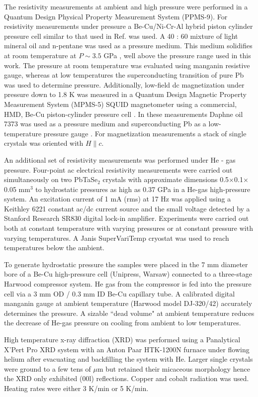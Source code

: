\documentclass[aps,prb,preprint,groupedaddress,showpacs,amsmath,amssymb]{revtex4}
\begin{document}
The resistivity measurements at ambient and high  pressure were performed in a Quantum Design Physical Property Measurement System (PPMS-9). For resistivity measurements under pressure a Be-Cu/Ni-Cr-Al hybrid piston cylinder pressure cell similar to that used in Ref.  was used. A 40 : 60 mixture of light mineral oil and n-pentane was used as a pressure medium. This medium solidifies at room temperature at $P \sim 3.5$ GPa \cite{bud84a,tor15a}, well above the pressure range used in this work. The pressure at room temperature was evaluated using manganin resistive gauge, whereas at low temperatures the superconducting transition of pure Pb \cite{eil81a} was used to determine pressure. Additionally, low-field dc magnetization under pressure down to 1.8 K was measured in a Quantum Design Magnetic Property Measurement System (MPMS-5) SQUID magnetometer using a commercial, HMD, Be-Cu piston-cylinder pressure cell \cite{hmd}. In these measurements Daphne oil 7373 was used as a pressure medium and superconducting Pb as a low-temperature pressure gauge \cite{eil81a}. For magnetization measurements a stack of single crystals was oriented with $H \| c$.

An additional set of resistivity measurements was performed under He - gas pressure. Four-point ac electrical resistivity measurements were carried out simultaneously on two PbTaSe$_2$ crystals with approximate dimensions 0.5$\times$0.1$\times$0.05 mm$^3$ to hydrostatic pressures as high as 0.37 GPa in a He-gas high-pressure system. An excitation current of 1 mA (rms) at 17 Hz was applied using a Keithley 6221 constant ac/dc current source and the small voltage detected by a Stanford Research SR830 digital lock-in amplifier. Experiments were carried out both at constant temperature with varying pressures or at constant pressure with varying temperatures. A Janis SuperVariTemp cryostat was used to reach temperatures below the ambient.

To generate hydrostatic pressure the samples were placed in the 7 mm diameter bore of a Be-Cu  high-pressure cell (Unipress, Warsaw) connected to a three-stage Harwood compressor system. He gas from the compressor is fed into the pressure cell via a 3 mm OD / 0.3 mm ID Be-Cu capillary tube. A calibrated digital manganin gauge at ambient temperature (Harwood model DJ-320/42) accurately determines the pressure. A sizable ``dead volume" at ambient temperature reduces the decrease of He-gas pressure on cooling from ambient to low temperatures. 

High temperature x-ray diffraction (XRD) was performed using a Panalytical X'Pert Pro XRD system with an Anton Paar HTK-1200N furnace under flowing  helium after evacuating and backfilling the system with He. Larger single crystals were ground to a few tens of $\mu$m but retained their micaceous morphology hence the XRD only exhibited (00l) reflections. Copper and cobalt radiation was used. Heating rates were either 3 K/min or 5 K/min.
\end{document}
